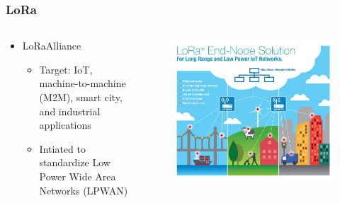 \begin{frame}[fragile]
  \frametitle{LoRa\texttrademark}
  \begin{columns}
    \begin{column}{.48\linewidth}
      \begin{itemize}
	\item LoRa\texttrademark Alliance
	\begin{itemize}
	  \item Target: IoT,  machine-to-machine (M2M), smart city, and industrial applications
	  \item Intiated to standardize Low Power Wide Area Networks (LPWAN)
	\end{itemize}
      \end{itemize}
    \end{column}
    \hfill
    \begin{column}{.48\linewidth}
    	\begin{figure}
	  \centering
	  \includegraphics[width=\linewidth]{img/lora.jpg}
    	\end{figure}

    \end{column}
  \end{columns}
\end{frame}

